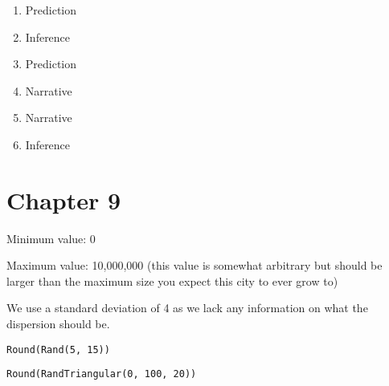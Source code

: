 \documentclass[]{memoir}
\begin{document}

\begin{enumerate}
\def\labelenumi{\arabic{enumi}.}
\itemsep1pt\parskip0pt
\item
  Prediction
\item
  Inference
\item
  Prediction
\item
  Narrative
\item
  Narrative
\item
  Inference
\end{enumerate}

\section{Chapter 9}


Minimum value: 0

Maximum value: 10,000,000 (this value is somewhat arbitrary but should
be larger than the maximum size you expect this city to ever grow to)


We use a standard deviation of 4 as we lack any information on what the
dispersion should be.

\lstinline!Round(Rand(5, 15))!


\lstinline!Round(RandTriangular(0, 100, 20))!

\end{document}
